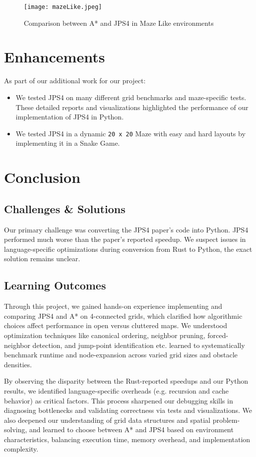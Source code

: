\documentclass[11pt]{article}
\begin{document}
\begin{figure}
    \centering
    \texttt{[image: mazeLike.jpeg]}
    \caption{Comparison between A* and JPS4 in Maze Like environments}
    \label{fig:mazeLike}
\end{figure}

\newpage
\section{Enhancements}

As part of our additional work for our project:

\begin{itemize}
    \item We tested JPS4 on many different grid benchmarks and maze-specific tests. These detailed reports and visualizations highlighted the performance of our implementation of JPS4 in Python.
    \item We tested JPS4 in a dynamic \texttt{20 x 20} Maze with easy and hard layouts by implementing it in a Snake Game.
\end{itemize}

\section{Conclusion}
\subsection{Challenges \& Solutions}

Our primary challenge was converting the JPS4 paper's code into Python. JPS4 performed much worse than the paper's reported speedup. We suspect issues in language-specific optimizations during conversion from Rust to Python, the exact solution remains unclear.

\subsection{Learning Outcomes}
Through this project, we gained hands-on experience implementing and comparing JPS4 and A* on 4-connected grids, which clarified how algorithmic choices affect performance in open versus cluttered maps. We understood optimization techniques like canonical ordering, neighbor pruning, forced-neighbor detection, and jump-point identification etc. learned to systematically benchmark runtime and node-expansion across varied grid sizes and obstacle densities. 

By observing the disparity between the Rust-reported speedups and our Python results, we identified language-specific overheads (e.g. recursion and cache behavior) as critical factors. This process sharpened our debugging skills in diagnosing bottlenecks and validating correctness via tests and visualizations. We also deepened our understanding of grid data structures and spatial problem-solving, and learned to choose between A* and JPS4 based on environment characteristics, balancing execution time, memory overhead, and implementation complexity.
\end{document}
